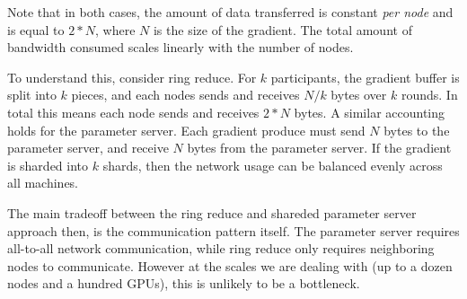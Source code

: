 Note that in both cases, the amount of data transferred is constant \textit{per node} and is equal to $2 * N$, where $N$ is the size of the gradient. The total amount of bandwidth consumed scales linearly with the number of nodes.

To understand this, consider ring reduce. For $k$ participants, the gradient buffer is split into $k$ pieces, and each nodes sends and receives $N / k$ bytes over $k$ rounds. In total this means each node sends and receives $2 * N$ bytes. A similar accounting holds for the parameter server. Each gradient produce must send $N$ bytes to the parameter server, and receive $N$ bytes from the parameter server. If the gradient is sharded into $k$ shards, then the network usage can be balanced evenly across all machines.

The main tradeoff between the ring reduce and shareded parameter server approach then, is the communication pattern itself. The parameter server requires all-to-all network communication, while ring reduce only requires neighboring nodes to communicate. However at the scales we are dealing with (up to a dozen nodes and a hundred GPUs), this is unlikely to be a bottleneck.

